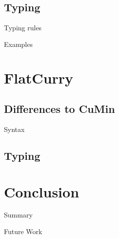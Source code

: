\documentclass{beamer}
\begin{document}
\subsection{Typing}
\begin{frame}{Typing rules}
\end{frame}
\begin{frame}{Examples}
\end{frame}
\section{FlatCurry}
\subsection{Differences to CuMin}
\begin{frame}{Syntax}
\end{frame}
\subsection{Typing}
\section{Conclusion}
\begin{frame}{Summary}
\end{frame}
\begin{frame}{Future Work}
\end{frame}
\end{document}
